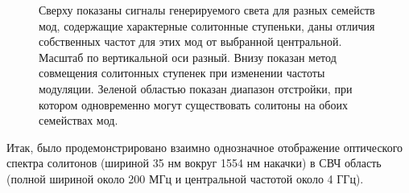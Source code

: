 \begin{figure}[ht]
\begin{minipage}[ht]{1\linewidth}
\end{minipage}
\caption{Сверху показаны сигналы генерируемого света для разных семейств мод, содержащие характерные солитонные ступеньки, даны отличия собственных частот для этих мод от выбранной центральной. Масштаб по вертикальной оси разный. Внизу показан метод совмещения солитонных ступенек при изменении частоты модуляции. Зеленой областью показан диапазон отстройки, при котором одновременно могут существовать солитоны на обоих семействах мод.}
\label{Figure2}
\end{figure}


Итак, было продемонстрировано взаимно однозначное отображение оптического спектра солитонов (шириной 35 нм вокруг 1554 нм накачки) в СВЧ область (полной шириной около 200 МГц и центральной частотой около 4 ГГц).

